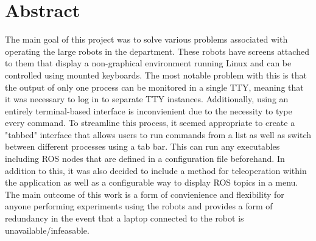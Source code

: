 \thispagestyle{empty}


\section*{\centering Abstract}

The main goal of this project was to solve various problems associated with operating the large robots in the department. These robots have screens attached to them that display a non-graphical environment running Linux and can be controlled using mounted keyboards. The most notable problem with this is that the output of only one process can be monitored in a single {\selectfont TTY}, meaning that it was necessary to log in to separate {\selectfont TTY} instances. Additionally, using an entirely terminal-based interface is inconvienient due to the necessity to type every command. To streamline this process, it seemed appropriate to create a "tabbed" interface that allows users to run commands from a list as well as switch between different processes using a tab bar. This can run any executables including {\selectfont ROS} nodes that are defined in a configuration file beforehand. In addition to this, it was also decided to include a method for teleoperation within the application as well as a configurable way to display {\selectfont ROS} topics in a menu. The main outcome of this work is a form of convienience and flexibility for anyone performing experiments using the robots and provides a form of redundancy in the event that a laptop connected to the robot is unavailable/infeasable.

